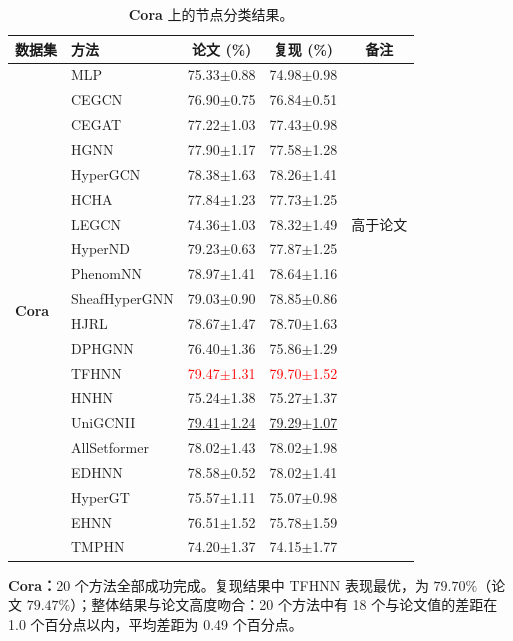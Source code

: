 \documentclass[11pt,a4paper]{article}
\begin{document}
\begin{table}[H]
	\centering\small
	\begin{tabular}{llccc}
		\toprule
		数据集 & 方法 & 论文 (\%) & 复现 (\%) & 备注 \\
		\midrule
		\multirow{20}{*}{\textbf{Cora}} & MLP               & 75.33$\pm$0.88   & 74.98$\pm$0.98   &  \\
		 & CEGCN             & 76.90$\pm$0.75   & 76.84$\pm$0.51   &  \\
		 & CEGAT             & 77.22$\pm$1.03   & 77.43$\pm$0.98   &  \\
		 & HGNN              & 77.90$\pm$1.17   & 77.58$\pm$1.28   &  \\
		 & HyperGCN          & 78.38$\pm$1.63   & 78.26$\pm$1.41   &  \\
		 & HCHA              & 77.84$\pm$1.23   & 77.73$\pm$1.25   &  \\
		 & LEGCN             & 74.36$\pm$1.03   & 78.32$\pm$1.49   & 高于论文 \\
		 & HyperND           & 79.23$\pm$0.63   & 77.87$\pm$1.25   &  \\
		 & PhenomNN          & 78.97$\pm$1.41   & 78.64$\pm$1.16   &  \\
		 & SheafHyperGNN     & 79.03$\pm$0.90   & 78.85$\pm$0.86   &  \\
		 & HJRL              & 78.67$\pm$1.47   & 78.70$\pm$1.63   &  \\
		 & DPHGNN            & 76.40$\pm$1.36   & 75.86$\pm$1.29   &  \\
		 & TFHNN             & \textcolor{red}{79.47$\pm$1.31}   & \textcolor{red}{79.70$\pm$1.52}   &  \\
		 & HNHN              & 75.24$\pm$1.38   & 75.27$\pm$1.37   &  \\
		 & UniGCNII          & \underline{79.41$\pm$1.24}   & \underline{79.29$\pm$1.07}   &  \\
		 & AllSetformer      & 78.02$\pm$1.43   & 78.02$\pm$1.98   &  \\
		 & EDHNN             & 78.58$\pm$0.52   & 78.02$\pm$1.41   &  \\
		 & HyperGT           & 75.57$\pm$1.11   & 75.07$\pm$0.98   &  \\
		 & EHNN              & 76.51$\pm$1.52   & 75.78$\pm$1.59   &  \\
		 & TMPHN             & 74.20$\pm$1.37   & 74.15$\pm$1.77   &  \\
		\bottomrule
	\end{tabular}
	\caption{\textbf{Cora} 上的节点分类结果。}
\end{table}
\par\smallskip
\noindent\textbf{Cora：}20 个方法全部成功完成。复现结果中 TFHNN 表现最优，为 $79.70\%$（论文 $79.47\%$）；整体结果与论文高度吻合：20 个方法中有 18 个与论文值的差距在 1.0 个百分点以内，平均差距为 0.49 个百分点。
\end{document}
